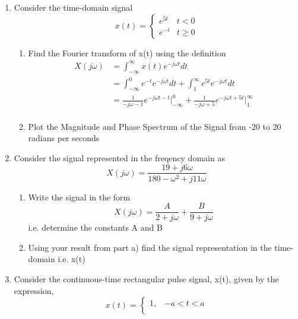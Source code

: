 \documentclass{article}
\begin{document}
\begin{enumerate}
    \item Consider the time-domain signal
    \begin{equation}
        x(t) = \begin{cases}
        e^{5t} &  t < 0\\
        e^{-t} & t \geq 0
        \end{cases}
    \end{equation}
    \begin{enumerate}
        \item Find the Fourier transform of x(t) using the definition
        \begin{align}
            X(j\omega) &= \int_{-\infty}^\infty x(t) e^{-j\omega t}dt\\
            &= \int_{-\infty}^0 e^{-t} e^{-j\omega t}dt+\int_{1}^\infty e^{5t} e^{-j\omega t}dt\\
            &= \frac{1}{-j\omega - 1}e^{-j\omega t-t}\Bigg|_{-\infty}^0 + \frac{1}{-j\omega +5}e^{-j\omega t+5t}\Bigg|_{1}^\infty\\
        \end{align}
        \item Plot the Magnitude and Phase Spectrum of the Signal from -20 to 20 radians per seconds
    \end{enumerate}
    \newpage
    \item Consider the signal represented in the freqency domain as
    \begin{equation}
        X(j\omega) = \frac{19+j6\omega}{180-\omega^2+j11\omega}
    \end{equation}
    \begin{enumerate}
        \item Write the signal in the form
        \begin{equation}
            X(j\omega) = \frac{A}{2+j\omega}+\frac{B}{9+j\omega}
        \end{equation}
        i.e. determine the constants A and B
        \item Using your result from part a) find the signal representation in the time-domain i.e. x(t)
    \end{enumerate}
    \newpage
    \item Consider the continuous-time rectangular pulse signal, x(t), given by the expression,
    \begin{equation}
        x(t) = \begin{cases}
        1, & -a < t < a \\

\end{cases}
\end{equation}
\end{enumerate}
\end{document}

